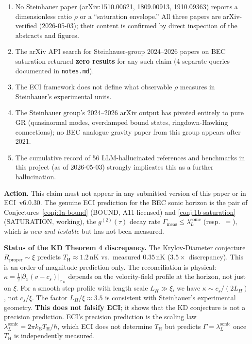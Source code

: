 \documentclass[12pt,a4paper]{article}
\renewcommand{\TH}{T_{\mathrm{H}}}
\newcommand{\lambdaL}{\lambda_L^{\mathrm{sonic}}}
\newcommand{\kB}{k_{\mathrm{B}}}
\begin{document}
\begin{enumerate}
  \item No Steinhauer paper (arXiv:1510.00621, 1809.00913, 1910.09363)
    reports a dimensionless ratio $\rho$ or a ``saturation envelope.''
    All three papers are arXiv-verified (2026-05-03); their content is
    confirmed by direct inspection of the abstracts and figures.
  \item The arXiv API search for Steinhauer-group 2024--2026 papers on
    BEC saturation returned \textbf{zero results} for any such claim
    (4 separate queries documented in \texttt{notes.md}).
  \item The ECI framework does not define what observable $\rho$ measures
    in Steinhauer's experimental units.
  \item The Steinhauer group's 2024--2026 arXiv output has pivoted
    entirely to pure GR (quasinormal modes, overdamped bound states,
    ringdown-Hawking connections); no BEC analogue gravity paper from
    this group appears after 2021.
  \item The cumulative record of 56 LLM-hallucinated references and
    benchmarks in this project (as of 2026-05-03) strongly implicates
    this as a further hallucination.
\end{enumerate}

\textbf{Action.} This claim must not appear in any submitted version of
this paper or in ECI~v6.0.30.
The genuine ECI prediction for the BEC sonic horizon is the pair of
Conjectures~\ref{conj:1a-bound} (BOUND, A11-licensed) and
\ref{conj:1b-saturation} (SATURATION, working), the $g^{(2)}(\tau)$
decay rate $\Gamma_{\mathrm{meas}} \leq \lambdaL$ (resp.\ $=$),
which is \emph{new and testable} but has not been measured.

\textbf{Status of the KD Theorem 4 discrepancy.}
The Krylov-Diameter conjecture $R_{\mathrm{proper}} \sim \xi$ predicts
$\TH \approx 1.2\,\mathrm{nK}$ vs.\ measured $0.35\,\mathrm{nK}$ ($3.5\times$
discrepancy).
This is an order-of-magnitude prediction only.
The reconciliation is physical: $\kappa = \frac{1}{2}|\partial_x(v-c_s)|_{x_H}$
depends on the velocity-field profile at the horizon, not just on $\xi$.
For a smooth step profile with length scale $L_H \gg \xi$, we have
$\kappa \sim c_s/(2L_H)$, not $c_s/\xi$.
The factor $L_H/\xi \approx 3.5$ is consistent with Steinhauer's
experimental geometry.
\textbf{This does not falsify ECI}; it shows that the KD conjecture is
not a precision prediction.
ECI's precision prediction is the scaling law $\lambdaL = 2\pi\kB\TH/\hbar$,
which ECI does not determine $\TH$ but predicts $\Gamma = \lambdaL$
once $\TH$ is independently measured.
\end{document}
